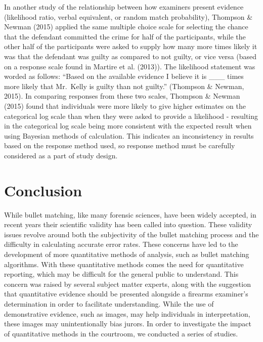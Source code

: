 \documentclass[print]{nuthesis}
\begin{document}
In another study of the relationship between how examiners present evidence (likelihood ratio, verbal equivalent, or random match probability), Thompson \& Newman (2015) applied the same multiple choice scale for selecting the chance that the defendant committed the crime for half of the participants, while the other half of the participants were asked to supply how many more times likely it was that the defendant was guilty as compared to not guilty, or vice versa (based on a response scale found in Martire et al. (2013)).
The likelihood statement was worded as follows: ``Based on the available evidence I believe it is \_\_\_ times more likely that Mr.~Kelly is guilty than not guilty.'' (Thompson \& Newman, 2015).
In comparing responses from these two scales, Thompson \& Newman (2015) found that individuals were more likely to give higher estimates on the categorical log scale than when they were asked to provide a likelihood - resulting in the categorical log scale being more consistent with the expected result when using Bayesian methods of calculation.
This indicates an inconsistency in results based on the response method used, so response method must be carefully considered as a part of study design.

\hypertarget{conclusion}{%
\section{Conclusion}\label{conclusion}}

While bullet matching, like many forensic sciences, have been widely accepted, in recent years their scientific validity has been called into question.
These validity issues revolve around both the subjectivity of the bullet matching process and the difficulty in calculating accurate error rates.
These concerns have led to the development of more quantitative methods of analysis, such as bullet matching algorithms.
With these quantitative methods comes the need for quantitative reporting, which may be difficult for the general public to understand.
This concern was raised by several subject matter experts, along with the suggestion that quantitative evidence should be presented alongside a firearms examiner's determination in order to facilitate understanding.
While the use of demonstrative evidence, such as images, may help individuals in interpretation, these images may unintentionally bias jurors.
In order to investigate the impact of quantitative methods in the courtroom, we conducted a series of studies.
\end{document}

